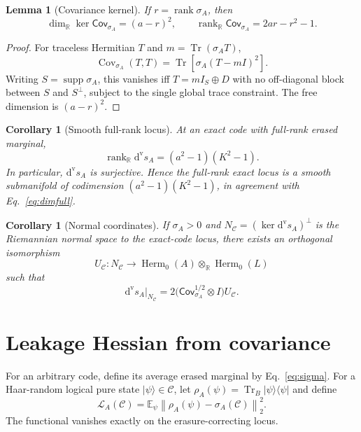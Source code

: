 \documentclass[11pt]{article}
\newtheorem{lemma}[theorem]{Lemma}
\newtheorem{corollary}[theorem]{Corollary}
\theoremstyle{definition}
\newcommand{\cC}{\mathcal C}
\newcommand{\cL}{\mathcal L}
\newcommand{\Herm}{\operatorname{Herm}}
\newcommand{\rank}{\operatorname{rank}}
\newcommand{\Tr}{\operatorname{Tr}}
\newcommand{\Cov}{\operatorname{Cov}}
\newcommand{\supp}{\operatorname{supp}}
\newcommand{\R}{\mathbb R}
\newcommand{\ket}[1]{\lvert #1\rangle}
\newcommand{\bra}[1]{\langle #1\rvert}
\newcommand{\norm}[1]{\left\lVert #1\right\rVert}
\newcommand{\dvs}{\mathrm d^{\mathrm v}\!s}
\begin{document}
\begin{lemma}[Covariance kernel]
If $r=\rank\sigma_A$, then
\begin{equation}
\dim_{\R}\ker\mathsf{Cov}_{\sigma_A}=(a-r)^2,
\qquad
\rank_{\R}\mathsf{Cov}_{\sigma_A}=2ar-r^2-1.
\end{equation}
\end{lemma}
\begin{proof}
For traceless Hermitian $T$ and $m=\Tr(\sigma_AT)$,
\[
\Cov_{\sigma_A}(T,T)=\Tr[\sigma_A(T-mI)^2].
\]
Writing $S=\supp\sigma_A$, this vanishes iff $T=mI_S\oplus D$ with no off-diagonal block between $S$ and $S^\perp$, subject to the single global trace constraint. The free dimension is $(a-r)^2$.
\end{proof}

\begin{corollary}[Smooth full-rank locus]
At an exact code with full-rank erased marginal,
\begin{equation}
\rank_{\R}\dvs_A=(a^2-1)(K^2-1).
\end{equation}
In particular, $\dvs_A$ is surjective. Hence the full-rank exact locus is a smooth submanifold of codimension $(a^2-1)(K^2-1)$, in agreement with Eq.~\eqref{eq:dimfull}.
\end{corollary}

\begin{corollary}[Normal coordinates]
If $\sigma_A>0$ and $N_{\cC}=(\ker\dvs_A)^\perp$ is the Riemannian normal space to the exact-code locus, there exists an orthogonal isomorphism
\[
U_{\cC}:N_{\cC}\to\Herm_0(A)\otimes_{\R}\Herm_0(L)
\]
such that
\begin{equation}
\dvs_A\big|_{N_{\cC}}=2\bigl(\mathsf{Cov}_{\sigma_A}^{1/2}\otimes I\bigr)U_{\cC}.
\end{equation}
\end{corollary}

\section{Leakage Hessian from covariance}
For an arbitrary code, define its average erased marginal by Eq.~\eqref{eq:sigma}. For a Haar-random logical pure state $\ket\psi\in\cC$, let $\rho_A(\psi)=\Tr_B\ket\psi\bra\psi$ and define
\begin{equation}
\cL_A(\cC)=\mathbb E_{\psi}\norm{\rho_A(\psi)-\sigma_A(\cC)}_2^2.
\label{eq:leak}
\end{equation}
The functional vanishes exactly on the erasure-correcting locus.
\end{document}
